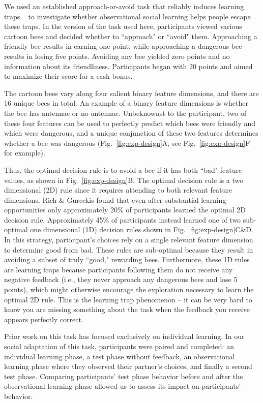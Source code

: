 \documentclass[11pt]{article} %
\begin{document}
We used an established approach-or-avoid task that reliably induces learning traps ~\cite{richLimitsLearningExploration2018, liCanLossesHelp2021,richLimitsLearningExploration2018, liquinChildrenAreMore2022} to investigate whether observational social learning helps people escape these traps. In the version of the task used here, participants viewed various cartoon bees and decided whether to ``approach" or ``avoid" them. Approaching a friendly bee results in earning one point, while approaching a dangerous bee results in losing five points. Avoiding any bee yielded zero points and no information about its friendliness. Participants began with 20 points and aimed to maximize their score for a cash bonus.

The cartoon bees vary along four salient binary feature dimensions, and there are 16 unique bees in total. An example of a binary feature dimensions is whether the bee has antennae or no antennae. Unbeknownst to the participant, two of these four features can be used to perfectly predict which bees were friendly and which were dangerous, and a unique conjunction of these two features determines whether a bee was dangerous (Fig.~\ref{fig:exp-design}A, see Fig.~\ref{fig:exp-design}F for example). 

Thus, the optimal decision rule is to avoid a bee if it has both ``bad" feature values, as shown in Fig.~\ref{fig:exp-design}B. The optimal decision rule is a two dimensional (2D) rule since it requires attending to both relevant feature dimensions. Rich \& Gureckis found that even after substantial learning opportunities only approximately 20\% of participants learned the optimal 2D decision rule. Approximately 45\% of participants instead learned one of two sub-optimal one dimensional (1D) decision rules shown in Fig.~\ref{fig:exp-design}C\&D. In this strategy, participant's choices rely on a single relevant feature dimension to determine good from bad.  These rules are sub-optimal because they result in avoiding a subset of truly ``good," rewarding bees. Furthermore, these 1D rules are learning traps because participants following them do not receive any negative feedback (i.e., they never approach any dangerous bees and lose 5 points), which might otherwise encourage the exploration necessary to learn the optimal 2D rule.  This is the learning trap phenomenon -- it can be very hard to know you are missing something about the task when the feedback you receive appears perfectly correct.

Prior work on this task has focused exclusively on individual learning. In our social adaptation of this task, participants were paired and completed: an individual learning phase, a test phase without feedback, an observational learning phase where they observed their partner's choices, and finally a second test phase. Comparing participants' test phase behavior before and after the observational learning phase allowed us to assess its impact on participants' behavior. 
\end{document}
